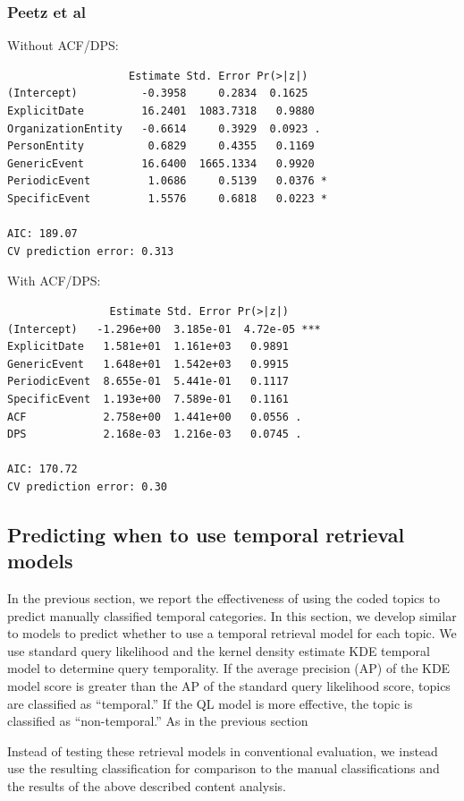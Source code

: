 \documentclass{sig-alternate}
\begin{document}
\subsubsection{Peetz et al}


Without ACF/DPS:
\begin{verbatim}
                   Estimate Std. Error Pr(>|z|)  
(Intercept)          -0.3958     0.2834  0.1625  
ExplicitDate         16.2401  1083.7318   0.9880  
OrganizationEntity   -0.6614     0.3929  0.0923 .
PersonEntity          0.6829     0.4355   0.1169  
GenericEvent         16.6400  1665.1334   0.9920  
PeriodicEvent         1.0686     0.5139   0.0376 *
SpecificEvent         1.5576     0.6818   0.0223 *

AIC: 189.07
CV prediction error: 0.313
\end{verbatim}

With ACF/DPS:
\begin{verbatim}
                Estimate Std. Error Pr(>|z|)    
(Intercept)   -1.296e+00  3.185e-01  4.72e-05 ***
ExplicitDate   1.581e+01  1.161e+03   0.9891    
GenericEvent   1.648e+01  1.542e+03   0.9915    
PeriodicEvent  8.655e-01  5.441e-01   0.1117    
SpecificEvent  1.193e+00  7.589e-01   0.1161    
ACF            2.758e+00  1.441e+00   0.0556 .  
DPS            2.168e-03  1.216e-03   0.0745 . 

AIC: 170.72
CV prediction error: 0.30
\end{verbatim}


\subsection{Predicting when to use temporal retrieval models}

In the previous section, we report the effectiveness of using the coded topics to predict manually classified temporal categories.  In this section, we develop similar to models to predict whether to use a temporal retrieval model for each topic. We use standard query likelihood \cite{XXX} and the kernel density estimate {KDE} temporal model \cite{Efron2014} to determine query temporality. If the average precision (AP) of the KDE model score is greater than the AP of the standard query likelihood score, topics are classified as ``temporal.''  If the QL model is more effective, the topic is classified as ``non-temporal.'' As in the previous section

Instead of testing these retrieval models in conventional evaluation, we instead use the resulting classification for comparison to the manual classifications and the results of the above described content analysis.
\end{document}

